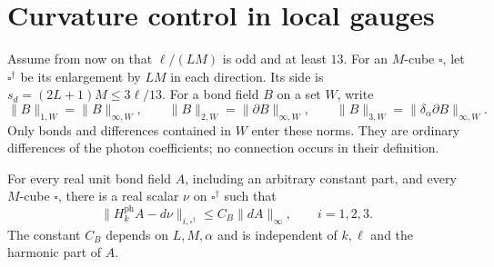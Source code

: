 \section{Curvature control in local gauges}
\label{subsec:photon-local-gauge}

Assume from now on that $\ell/(LM)$ is odd and at least $13$.
For an $M$-cube $\square$, let $\square^\dagger$ be its enlargement
by $LM$ in each direction. Its side is $s_d=(2L+1)M\le3\ell/13$.
For a bond field $B$ on a set $W$, write
\[
 \|B\|_{1,W}=\|B\|_{\infty,W},\qquad
 \|B\|_{2,W}=\|\partial B\|_{\infty,W},\qquad
 \|B\|_{3,W}=\|\delta_\alpha\partial B\|_{\infty,W}.
\]
Only bonds and differences contained in $W$ enter these norms.
They are ordinary differences of the photon coefficients; no
connection occurs in their definition.

\begin{proposition}\label{prop:photon-curvature-local-regularity}
For every real unit bond field $A$, including an arbitrary
constant part, and every $M$-cube $\square$, there is a real scalar
$\nu$ on $\square^\dagger$ such that
\begin{equation}\label{eq:photon-curvature-local-regularity}
 \|H_k^{\mathrm{ph}}A-d\nu\|_{i,\square^\dagger}
                         \le C_B\|dA\|_\infty,
                         \qquad i=1,2,3.
\end{equation}
The constant $C_B$ depends on $L,M,\alpha$ and is independent of
$k,\ell$ and the harmonic part of $A$.
\end{proposition}

